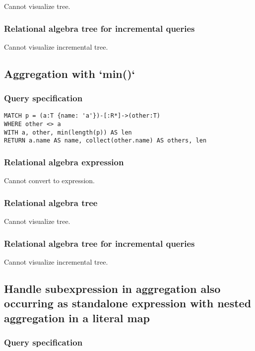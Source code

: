Cannot visualize tree.

\subsubsection*{Relational algebra tree for incremental queries}

Cannot visualize incremental tree.

\subsection{Aggregation with `min()`}

\subsubsection*{Query specification}

\begin{lstlisting}
MATCH p = (a:T {name: 'a'})-[:R*]->(other:T)
WHERE other <> a
WITH a, other, min(length(p)) AS len
RETURN a.name AS name, collect(other.name) AS others, len
\end{lstlisting}

\subsubsection*{Relational algebra expression}

Cannot convert to expression.

\subsubsection*{Relational algebra tree}

Cannot visualize tree.

\subsubsection*{Relational algebra tree for incremental queries}

Cannot visualize incremental tree.

\subsection{Handle subexpression in aggregation also occurring as standalone expression with nested aggregation in a literal map}

\subsubsection*{Query specification}

